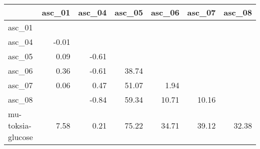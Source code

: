 \begin{tabular}{lrrrrrr}
\toprule
 & asc_01 & asc_04 & asc_05 & asc_06 & asc_07 & asc_08 \\
\midrule
asc_01 &  &  &  &  &  &  \\
asc_04 & -0.01 &  &  &  &  &  \\
asc_05 & 0.09 & -0.61 &  &  &  &  \\
asc_06 & 0.36 & -0.61 & 38.74 &  &  &  \\
asc_07 & 0.06 & 0.47 & 51.07 & 1.94 &  &  \\
asc_08 &  & -0.84 & 59.34 & 10.71 & 10.16 &  \\
mu-toksia-glucose & 7.58 & 0.21 & 75.22 & 34.71 & 39.12 & 32.38 \\
\bottomrule
\end{tabular}
